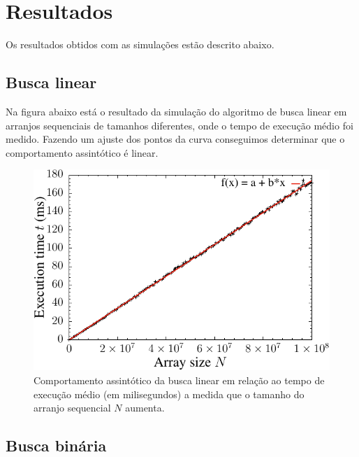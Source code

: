 \chapter{Resultados}

Os resultados obtidos com as simulações estão descrito abaixo.

\section{Busca linear}

Na figura abaixo está o resultado da simulação do algoritmo de busca linear em arranjos sequenciais de tamanhos diferentes, onde o tempo de execução médio foi medido. Fazendo um ajuste dos pontos da curva conseguimos determinar que o comportamento assintótico é linear.
\begin{figure}[H]
  \centering
  \includegraphics[scale=1.2]{../plots/lsearch_time.pdf}
  \caption{Comportamento assintótico da busca linear em relação ao tempo de execução médio (em milisegundos) a medida que o tamanho do arranjo sequencial $N$ aumenta.}
  \label{fig:lseach_time}
\end{figure} 


\section{Busca binária}

